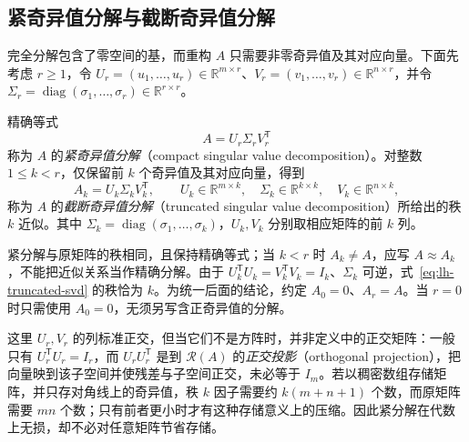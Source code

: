 \subsection{紧奇异值分解与截断奇异值分解}
\label{subsec:lh-compact-truncated-svd}

完全分解包含了零空间的基，而重构 $A$ 只需要非零奇异值及其对应向量。下面先考虑 $r\geq1$，令 $U_r=(u_1,\ldots,u_r)\in\mathbb R^{m\times r}$、$V_r=(v_1,\ldots,v_r)\in\mathbb R^{n\times r}$，并令 $\Sigma_r=\operatorname{diag}(\sigma_1,\ldots,\sigma_r)\in\mathbb R^{r\times r}$。

\begin{definition}[紧分解与截断分解]
\label{def:lh-compact-truncated-svd}
精确等式
\begin{equation}
A=U_r\Sigma_rV_r^{\mathsf T}
\label{eq:lh-compact-svd}
\end{equation}
称为 $A$ 的\emph{紧奇异值分解}（compact singular value decomposition）。对整数 $1\leq k<r$，仅保留前 $k$ 个奇异值及其对应向量，得到
\begin{equation}
A_k=U_k\Sigma_kV_k^{\mathsf T},\qquad
U_k\in\mathbb R^{m\times k},\quad
\Sigma_k\in\mathbb R^{k\times k},\quad
V_k\in\mathbb R^{n\times k},
\label{eq:lh-truncated-svd}
\end{equation}
称为 $A$ 的\emph{截断奇异值分解}（truncated singular value decomposition）所给出的秩 $k$ 近似。其中 $\Sigma_k=\operatorname{diag}(\sigma_1,\ldots,\sigma_k)$，$U_k,V_k$ 分别取相应矩阵的前 $k$ 列。
\end{definition}

紧分解与原矩阵的秩相同，且保持精确等式；当 $k<r$ 时 $A_k\ne A$，应写 $A\approx A_k$，不能把近似关系当作精确分解。由于 $U_k^{\mathsf T}U_k=V_k^{\mathsf T}V_k=I_k$、$\Sigma_k$ 可逆，式~\eqref{eq:lh-truncated-svd} 的秩恰为 $k$。为统一后面的结论，约定 $A_0=0$、$A_r=A$。当 $r=0$ 时只需使用 $A_0=0$，无须另写含正奇异值的分解。

这里 $U_r,V_r$ 的列标准正交，但当它们不是方阵时，并非定义中的正交矩阵：一般只有 $U_r^{\mathsf T}U_r=I_r$，而 $U_rU_r^{\mathsf T}$ 是到 $\mathcal R(A)$ 的\emph{正交投影}（orthogonal projection），把向量映到该子空间并使残差与子空间正交，未必等于 $I_m$。若以稠密数组存储矩阵，并只存对角线上的奇异值，秩 $k$ 因子需要约 $k(m+n+1)$ 个数，而原矩阵需要 $mn$ 个数；只有前者更小时才有这种存储意义上的压缩。因此紧分解在代数上无损，却不必对任意矩阵节省存储。

